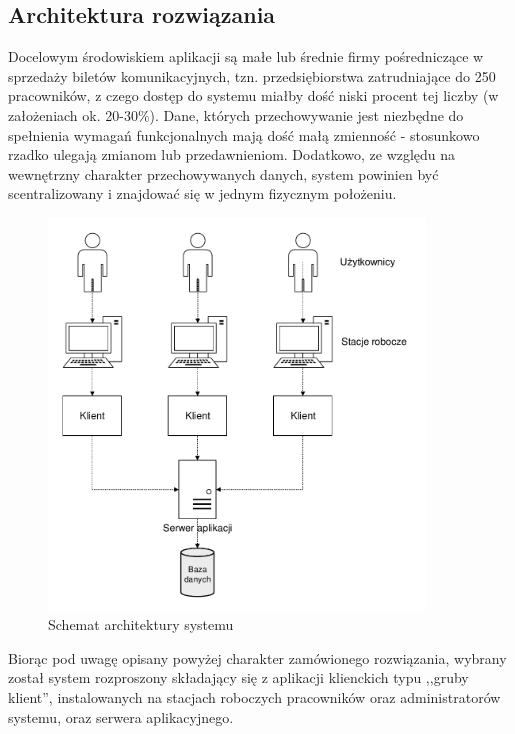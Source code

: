 \documentclass[10pt,a4paper]{article}
\begin{document}
\subsection{Architektura rozwiązania}
Docelowym środowiskiem aplikacji są małe lub średnie firmy pośredniczące w sprzedaży biletów komunikacyjnych, tzn. przedsiębiorstwa zatrudniające do 250 pracowników, z czego dostęp do systemu miałby dość niski procent tej liczby (w założeniach ok. 20-30\%). Dane, których przechowywanie jest niezbędne do spełnienia wymagań funkcjonalnych mają dość małą zmienność - stosunkowo rzadko ulegają zmianom lub przedawnieniom. Dodatkowo, ze względu na wewnętrzny charakter przechowywanych danych, system powinien być scentralizowany i znajdować się w jednym fizycznym położeniu.
\begin{figure}[H]
	\centering
	\includegraphics[width=10cm]{architecture-global.pdf}
	\caption{Schemat architektury systemu}
\end{figure}
Biorąc pod uwagę opisany powyżej charakter zamówionego rozwiązania, wybrany został system rozproszony składający się z aplikacji klienckich typu ,,gruby klient'', instalowanych na stacjach roboczych pracowników oraz administratorów systemu, oraz serwera aplikacyjnego.
\end{document}
